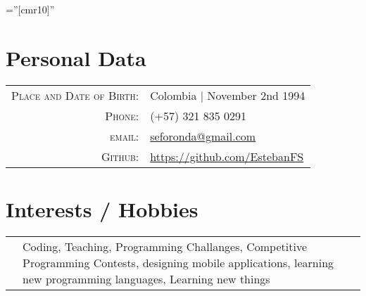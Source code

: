 \documentclass[a4paper,10pt]{article} %
\begin{document}
\pagestyle{empty} %

\font\fb=''[cmr10]'' %


\par{\bigskip\par} %

\section{Personal Data}

\begin{tabular}{rl}
\textsc{Place and Date of Birth:} & Colombia | November 2nd 1994\\
\textsc{Phone:} & (+57) 321 835 0291\\
\textsc{email:} & \href{mailto:seforonda@gmail.com}{seforonda@gmail.com}\\
\textsc{Github:} & \href{https://github.com/EstebanFS}{https://github.com/EstebanFS}
\end{tabular}



\section{Interests / Hobbies}
\begin{tabular}{r|p{11cm}}
& \footnotesize{Coding, Teaching, Programming Challanges, Competitive Programming Contests, designing mobile applications, learning new programming languages, Learning new things}
\end{tabular}

\end{document}
